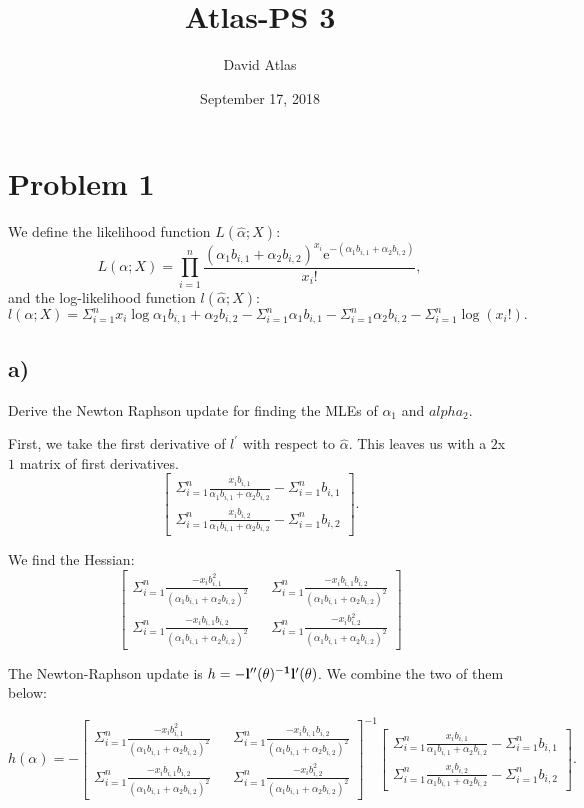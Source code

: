 \documentclass[]{article}
\title{Atlas-PS 3}
\author{David Atlas}
\date{September 17, 2018}
\begin{document}
\maketitle

\newcommand{\summ}{\Sigma_{i=1}^{n}}
\newcommand{\prodd}{\prod_{i=1}^{n}}
\newcommand{\pha}{\alpha_1 b_{i, 1} + \alpha_2 b_{i, 2}}
\newcommand{\gaus}[1]{\phi(x_i; \mu_{#1}, \sigma_{#1}^2)}
\newcommand{\gausk}[1]{\phi(x_i; \mu_{#1}^{(k)}, (\sigma_{#1}^2)^{(k)})}




\section{Problem 1}\label{problem-1}

We define the likelihood function \(L(\hat{\alpha}; X)\): \[
L(\alpha; X) = \prodd \frac{(\pha)^{x_i} \mathrm{e}^{-(\pha)}}{x_i!},
\] and the log-likelihood function \(l(\hat{\alpha}; X)\): \[
l(\alpha; X) = \summ x_i \log{\pha} - \summ{\alpha_1 b_{i, 1}} - 
  \summ{\alpha_2 b_{i,2}} - \summ \log(x_i !).
\]

\subsection{a)}\label{a}

Derive the Newton Raphson update for finding the MLEs of \(\alpha_1\)
and \(alpha_2\).

First, we take the first derivative of \(l^\prime\) with respect to
\(\hat{\alpha}\). This leaves us with a \(2\)x\(1\) matrix of first
derivatives. \[
\begin{bmatrix}
\summ \frac{x_i b_{i, 1}}{\pha} - \summ b_{i, 1} \\
\summ \frac{x_i b_{i, 2}}{\pha} - \summ b_{i, 2}
\end{bmatrix}.
\]

We find the Hessian: \[
\begin{bmatrix}
\summ \frac{-x_i b_{i, 1}^2}{(\pha)^2} && 
\summ \frac{-x_i b_{i, 1}b_{i, 2}}{(\pha)^2} \\
\summ \frac{-x_i b_{i, 1}b_{i, 2}}{(\pha)^2} &&
\summ \frac{-x_i b_{i, 2}^2}{(\pha)^2}
\end{bmatrix}
\]

The Newton-Raphson update is
\(h=-\bf{l}^{\prime\prime}(\bf{\theta})^{-1}\bf{l}^\prime(\bf{\theta})\).
We combine the two of them below:

\[
h(\alpha) = - \begin{bmatrix}
\summ \frac{-x_i b_{i, 1}^2}{(\pha)^2} && 
\summ \frac{-x_i b_{i, 1}b_{i, 2}}{(\pha)^2} \\
\summ \frac{-x_i b_{i, 1}b_{i, 2}}{(\pha)^2} &&
\summ \frac{-x_i b_{i, 2}^2}{(\pha)^2}
\end{bmatrix}^{-1} 
\begin{bmatrix}
\summ \frac{x_i b_{i, 1}}{\pha} - \summ b_{i, 1} \\
\summ \frac{x_i b_{i, 2}}{\pha} - \summ b_{i, 2}
\end{bmatrix}.
\]
\end{document}
